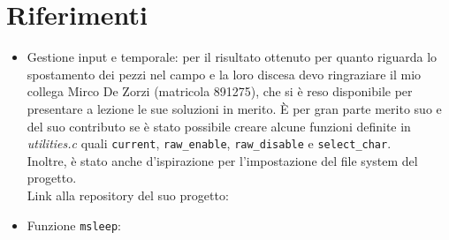 \documentclass[a4paper]{article}
\begin{document}
\section{Riferimenti}
\begin{itemize}
	\item Gestione input e temporale: per il risultato ottenuto per quanto riguarda lo spostamento dei pezzi nel campo e la loro discesa devo ringraziare il mio collega Mirco De Zorzi (matricola 891275), che si è reso disponibile per presentare a lezione le sue soluzioni in merito. È per gran parte merito suo e del suo contributo se è stato possibile creare alcune funzioni definite in \textit{utilities.c} quali \texttt{current}, \texttt{raw_enable}, \texttt{raw_disable} e \texttt{select_char}.\\
	Inoltre, è stato anche d'ispirazione per l'impostazione del file system del progetto.\\
	Link alla repository del suo progetto: \microdezorzi
	\item Funzione \texttt{msleep}: \msleepurl
\end{itemize}
\end{document}
